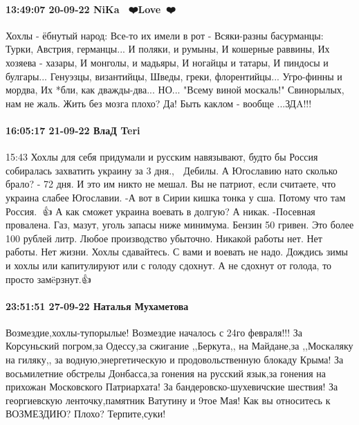 \paragraph{13:49:07 20-09-22 NiKa 🤍💙❤️Love🤍💙❤️}

Хохлы - ёбнутый народ:
Все-то их имели в рот -
Всяки-разны басурманцы:
Турки, Австрия, германцы...
И поляки, и румыны,
И кошерные раввины,
Их хозяева - хазары,
И монголы, и мадьяры,
И ногайцы и татары,
И пиндосы и булгары...
Генуэзцы, византийцы,
Шведы, греки, флорентийцы...
Угро-финны и мордва,
Их *бли, как дважды-два...
НО...
"Всему виной москаль!"
Свинорылых, нам не жаль.
Жить без мозга плохо? Да!
Быть каклом - вообще ...ЗДA!!!

\paragraph{16:05:17 21-09-22 ВлаД Teri}
15:43
Хохлы для себя придумали и русским навязывают, будто бы Россия собиралась захватить украину за 3 дня., 🙂
Дебилы. А Югославию нато сколько брало?
- 72 дня. И это им никто не мешал.
Вы не патриот, если считаете, что украина слабее Югославии.
-А вот в Сирии кишка тонка у сша. Потому что там Россия. 🙂👍
А как сможет украина воевать в долгую?
А никак.
-Посевная провалена. Газ, мазут, уголь запасы ниже минимума.
Бензин 50 гривен.
Это более 100 рублей литр.
Любое производство убыточно.
Никакой работы нет.
Нет работы. Нет жизни.
Хохлы сдавайтесь.
С вами и воевать не надо. Дождись зимы и хохлы или капитулируют или с голоду сдохнут.
А не сдохнут от голода, то просто замëрзнут.👍

\paragraph{23:51:51 27-09-22 Наталья Мухаметова}

Возмездие,хохлы-тупорылые! Возмездие началось с 24го февраля!!! За Корсуньский
погром,за Одессу,за сжигание ,,Беркута,, на Майдане,за ,,Москаляку на гиляку,,
за водную,энергетическую и продовольственную блокаду Крыма! За восьмилетние
обстрелы Донбасса,за гонения на русский язык,за гонения на прихожан Московского
Патриархата! За бандеровско-шухевичские шествия! За георгиевскую
ленточку,памятник Ватутину и 9тое Мая! Как вы относитесь к ВОЗМЕЗДИЮ? Плохо?
Терпите,суки!

